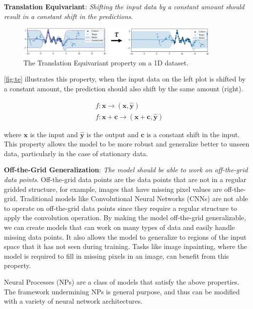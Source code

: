 \documentclass[../../main.tex]{subfiles}
\begin{document}
\textbf{Translation Equivariant}: \emph{Shifting the input data by a constant amount should result in a constant shift in the predictions}. 

\begin{figure}[H]
	\centering
	\includegraphics[width=0.9\textwidth]{./te.PNG}
	\caption{The Translation Equivariant property on a 1D dataset.}
	\label{fig:te}
\end{figure}


\autoref{fig:te} illustrates this property, when the input data on the left plot is shifted by a constant amount, the prediction should also shift by the same amount (right).

\begin{align}
	&f: \bm{x} \rightarrow (\bm{x}, \bm{\hat{y}}) \\
	&f: \bm{x} + \bm{c} \rightarrow (\bm{x} + \bm{c}, \bm{\hat{y}})
\end{align}

where $\bm{x}$ is the input and $\bm{\hat{y}}$ is the output and $\bm{c}$ is a constant shift in the input. This property allows the model to be more robust and generalize better to unseen data, particularly in the case of stationary data.


\textbf{Off-the-Grid Generalization}: \emph{The model should be able to work on off-the-grid data points}. Off-the-grid data points are the data points that are not in a regular gridded structure, for example, images that have missing pixel values are off-the-grid. Traditional models like Convolutional Neural Networks (CNNs) are not able to operate on off-the-grid data points since they require a regular structure to apply the convolution operation. By making the model off-the-grid generalizable, we can create models that can work on many types of data and easily handle missing data points. It also allows the model to generalize to regions of the input space that it has not seen during training. Tasks like image inpainting, where the model is required to fill in missing pixels in an image, can benefit from this property.


Neural Processes (NPs) \cite{garnelo2018neural} are a class of models that satisfy the above properties. The framework undermining NPs is general purpose, and thus can be modified with a variety of neural network architectures. 
\end{document}
